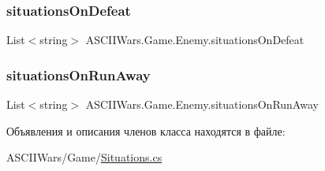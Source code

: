 \subsubsection{\texorpdfstring{situations\+On\+Defeat}{situationsOnDefeat}}
{\footnotesize\ttfamily List$<$string$>$ A\+S\+C\+I\+I\+Wars.\+Game.\+Enemy.\+situations\+On\+Defeat}

\hypertarget{class_a_s_c_i_i_wars_1_1_game_1_1_enemy_aaf3d6f61b5b3bc7aad9188a0eb9795aa}{}\label{class_a_s_c_i_i_wars_1_1_game_1_1_enemy_aaf3d6f61b5b3bc7aad9188a0eb9795aa} 
\subsubsection{\texorpdfstring{situations\+On\+Run\+Away}{situationsOnRunAway}}
{\footnotesize\ttfamily List$<$string$>$ A\+S\+C\+I\+I\+Wars.\+Game.\+Enemy.\+situations\+On\+Run\+Away}



Объявления и описания членов класса находятся в файле\+:\begin{DoxyCompactItemize}
\item 
A\+S\+C\+I\+I\+Wars/\+Game/\hyperlink{_situations_8cs}{Situations.\+cs}\end{DoxyCompactItemize}
